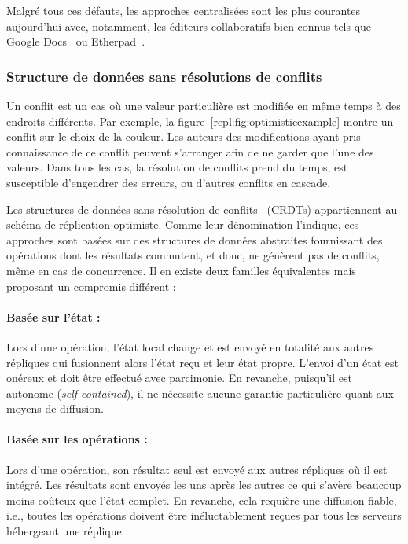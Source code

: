 \noindent Malgré tous ces défauts, les approches centralisées sont les plus
courantes aujourd'hui avec, notamment, les éditeurs collaboratifs bien connus
tels que Google Docs~\cite{googledocs} ou Etherpad~\cite{etherpad}.


\subsubsection{Structure de données sans résolutions de conflits}
\label{repl:subsubsec:crdts}

Un conflit est un cas où une valeur particulière est modifiée en même temps à
des endroits différents. Par exemple, la figure~\ref{repl:fig:optimisticexample}
montre un conflit sur le choix de la couleur. Les auteurs des modifications
ayant pris connaissance de ce conflit peuvent s'arranger afin de ne garder que
l'une des valeurs. Dans tous les cas, la résolution de conflits prend du temps,
est susceptible d'engendrer des erreurs, ou d'autres conflits en cascade.

Les structures de données sans résolution de
conflits~\cite{shapiro2011comprehensive} (CRDTs) appartiennent au schéma de
réplication optimiste. Comme leur dénomination l'indique, ces approches sont
basées sur des structures de données abstraites fournissant des opérations dont
les résultats commutent, et donc, ne génèrent pas de conflits, même en cas de
concurrence.  Il en existe deux familles équivalentes mais proposant un
compromis différent :

\paragraph{Basée sur l'état :} Lors d'une opération, l'état local change et est
envoyé en totalité aux autres répliques qui fusionnent alors l'état reçu et leur
état propre. L'envoi d'un état est onéreux et doit être effectué avec
parcimonie. En revanche, puisqu'il est autonome (\emph{self-contained}), il ne
nécessite aucune garantie particulière quant aux moyens de diffusion.

\paragraph{Basée sur les opérations :} Lors d'une opération, son résultat seul
est envoyé aux autres répliques où il est intégré. Les résultats sont envoyés
les uns après les autres ce qui s'avère beaucoup moins coûteux que l'état
complet. En revanche, cela requière une diffusion fiable, i.e., toutes les
opérations doivent être inéluctablement reçues par tous les serveurs hébergeant
une réplique.

